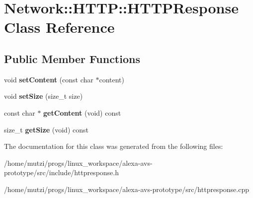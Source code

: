 \hypertarget{classNetwork_1_1HTTP_1_1HTTPResponse}{}\section{Network\+:\+:H\+T\+TP\+:\+:H\+T\+T\+P\+Response Class Reference}
\label{classNetwork_1_1HTTP_1_1HTTPResponse}
\subsection*{Public Member Functions}
\begin{DoxyCompactItemize}
\item 
\mbox{\label{classNetwork_1_1HTTP_1_1HTTPResponse_a61b35ad0b64af2114b1fe41ccab3584c}} 
void {\bfseries set\+Content} (const char $\ast$content)
\item 
\mbox{\label{classNetwork_1_1HTTP_1_1HTTPResponse_aa08f23a9aabb78996af2f409ee31a9a7}} 
void {\bfseries set\+Size} (size\+\_\+t size)
\item 
\mbox{\label{classNetwork_1_1HTTP_1_1HTTPResponse_a8847fa066220168275002d7476a1be7c}} 
const char $\ast$ {\bfseries get\+Content} (void) const
\item 
\mbox{\label{classNetwork_1_1HTTP_1_1HTTPResponse_a062554f01c8b5aa22fc001cde532fd59}} 
size\+\_\+t {\bfseries get\+Size} (void) const
\end{DoxyCompactItemize}


The documentation for this class was generated from the following files\+:\begin{DoxyCompactItemize}
\item 
/home/mutzi/progs/linux\+\_\+workspace/alexa-\/avs-\/prototype/src/include/httpresponse.\+h\item 
/home/mutzi/progs/linux\+\_\+workspace/alexa-\/avs-\/prototype/src/httpresponse.\+cpp\end{DoxyCompactItemize}
